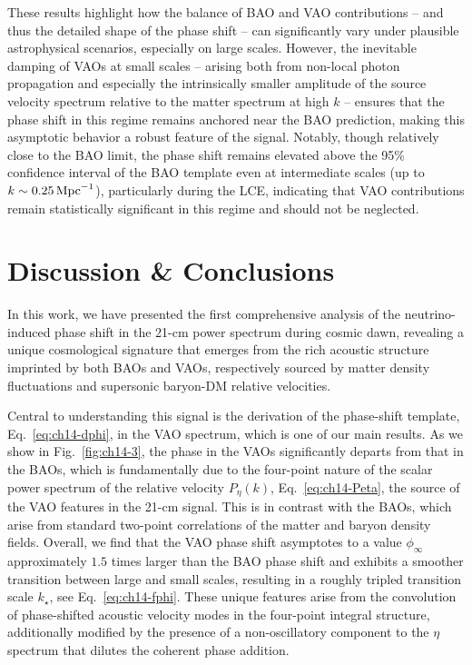 These results highlight how the balance of BAO and VAO contributions -- and thus the detailed shape of the phase shift -- can significantly vary under plausible astrophysical scenarios, especially on large scales.  However, the inevitable damping of VAOs at small scales --  arising both from non-local photon propagation and especially the intrinsically smaller amplitude of the source velocity spectrum relative to the matter spectrum at high $k$ -- ensures that the phase shift in this regime remains anchored near the BAO prediction, making this asymptotic behavior a robust feature of the signal. Notably, though relatively close to the BAO limit, the phase shift remains elevated above the 95\% confidence interval of the BAO template even at intermediate scales (up to $k \sim 0.25\,\rm{Mpc}^{-1}$), particularly during the LCE, indicating that VAO contributions remain statistically significant in this regime and should not be neglected.

\section{Discussion \& Conclusions}\label{sec:ch14-5}

\noindent In this work, we have presented the first comprehensive analysis of the neutrino-induced phase shift in the 21-cm power spectrum during cosmic dawn, revealing a unique cosmological signature that emerges from the rich acoustic structure imprinted by both BAOs and VAOs, respectively sourced by matter density fluctuations and supersonic baryon-DM relative velocities.

Central to understanding this signal is the derivation of the phase-shift template, Eq.~\eqref{eq:ch14-dphi}, in the VAO spectrum, which
is one of our main results. As we show in Fig.~\ref{fig:ch14-3}, the phase in the VAOs significantly departs from that in the BAOs, which is fundamentally due to the four-point nature of the scalar power spectrum of the relative velocity $P_\eta(k)$, Eq.~\eqref{eq:ch14-Peta}, the source of the VAO features in the 21-cm signal. This is in contrast with the BAOs, which arise from standard two-point correlations of the matter and baryon density fields. Overall, we find that the VAO phase shift asymptotes to a value $\phi_\infty$ approximately $1.5$ times larger than the BAO phase shift and exhibits a smoother transition between large and small scales, resulting in a roughly tripled transition scale $k_\star$, see Eq.~\eqref{eq:ch14-fphi}. These unique features arise from the convolution of phase-shifted acoustic velocity modes in the four-point integral structure, additionally modified by the presence of a non-oscillatory component to the $\eta$ spectrum that dilutes the coherent phase addition.

